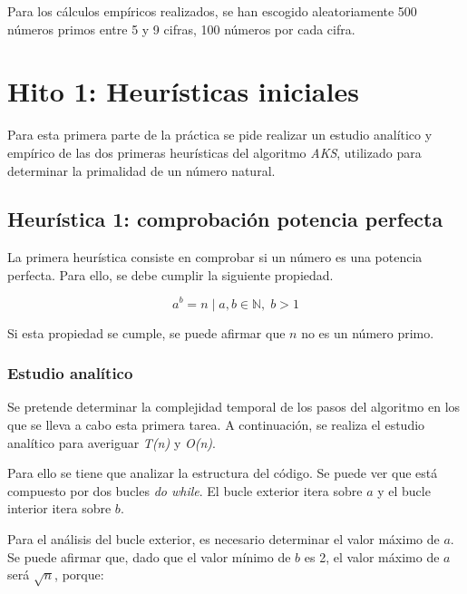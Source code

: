 \documentclass{uc3mpracticas}
\begin{document}
  \vspace{2mm}

  Para los cálculos empíricos realizados, se han escogido aleatoriamente 500 números primos entre 5 y 9 cifras, 100 números por cada cifra.


  \section{Hito 1: Heurísticas iniciales}

  Para esta primera parte de la práctica se pide realizar un estudio analítico y empírico de las dos primeras heurísticas del algoritmo \textit{AKS}, utilizado para determinar la primalidad de un número natural.

  \vspace{2mm}




  \subsection{Heurística 1: comprobación potencia perfecta}

  La primera heurística consiste en comprobar si un número es una potencia perfecta. Para ello, se debe cumplir la siguiente propiedad.

  $$ a^b = n \; | \; a, b \in \mathbb{N}, \; b>1$$

  Si esta propiedad se cumple, se puede afirmar que $n$ no es un número primo.


  \subsubsection{Estudio analítico}
  Se pretende determinar la complejidad temporal de los pasos del algoritmo en los que se lleva a cabo esta primera tarea. A continuación, se realiza el estudio analítico para averiguar \textit{T(n)} y \textit{O(n)}.

  \vspace{2mm}

  Para ello se tiene que analizar la estructura del código. Se puede ver que está compuesto por dos bucles \textit{do while}. El bucle exterior itera sobre $a$ y el bucle interior itera sobre $b$.

  \vspace{2mm}

  Para el análisis del bucle exterior, es necesario determinar el valor máximo de $a$.
  Se puede afirmar que, dado que el valor mínimo de $b$ es 2, el valor máximo de $a$ será $\sqrt{n}$, porque:
\end{document}
